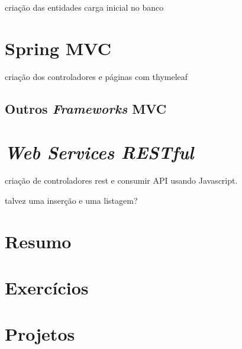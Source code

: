 criação das entidades
carga inicial no banco


\section{Spring MVC}

criação dos controladores e páginas com thymeleaf


\subsection{Outros \textit{Frameworks} MVC}



\section{\textit{Web Services RESTful}}

criação de controladores rest e consumir API usando Javascript.

talvez uma inserção e uma listagem?


\section{Resumo}

\section{Exercícios}

\section{Projetos}
